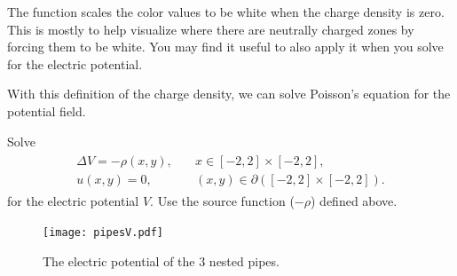 The function  scales the color values to be white when the charge density is zero.
This is mostly to help visualize where there are neutrally charged zones by forcing them to be white.
You may find it useful to also apply it when you solve for the electric  potential.

With this definition of the charge density, we can solve Poisson's equation for the potential field.

\begin{problem}
Solve 
\begin{align}
	\begin{split}
	\Delta V = -\rho(x,y), &{}\quad x \in [-2,2]\times [-2,2],\\
	u(x,y) = 0, &{}\quad (x,y) \in \partial ([-2,2]\times [-2,2]).
	\end{split}
	\label{poisson2d:laplace}
\end{align}
% 
for the electric potential $V.$
Use the source function ($-\rho$) defined above. %
\end{problem}

\begin{figure}
\texttt{[image: pipesV.pdf]}
\caption{The electric potential of the 3 nested pipes.}
\end{figure}